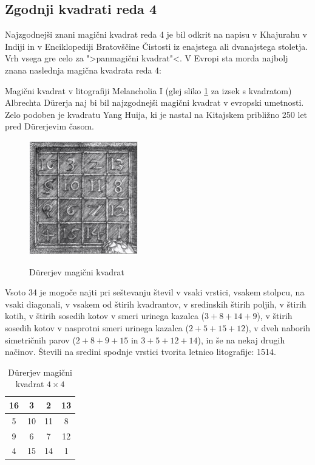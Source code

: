 \documentclass[a4paper,12pt]{article}
\theoremstyle{definition}
\theoremstyle{plain}
\newenvironment{magic}[3]{
   \begin{table}[!ht]
   \centering
   \caption{#2}
   \label{#3}
   \large
   \begin{tabular}{|*{#1}{c|}} \hline
}{
 \end{tabular}
   \normalsize
\end{table}  
}
\begin{document}

\subsection{Zgodnji kvadrati reda 4}

Najzgodnejši znani magični kvadrat reda 4 je bil odkrit na napisu
v Khajurahu v Indiji in v Enciklopediji Bratovščine Čistosti iz enajstega
ali dvanajstega stoletja. Vrh vsega gre celo za ">panmagični kvadrat"<.
V Evropi sta morda najbolj znana naslednja magična kvadrata reda 4:

Magični kvadrat v litografiji Melancholia I (glej sliko \ref{fig:durer}
za izsek s kvadratom) Albrechta Dürerja naj bi bil najzgodnejši magični kvadrat
v evropski umetnosti. Zelo podoben je kvadratu Yang Huija, ki je nastal na Kitajskem
približno 250 let pred Dürerjevim časom. %

\begin{figure}[!ht]
   \centering
   \caption{Dürerjev magični kvadrat}
\includegraphics[scale=1.5]{durer.png}
\label{fig:durer}
\end{figure}

Vsoto 34 je mogoče najti pri seštevanju števil v vsaki vrstici, vsakem stolpcu,
na vsaki diagonali, v vsakem od štirih kvadrantov, v sredinskih štirih poljih,
v štirih kotih, v štirih sosedih kotov v smeri urinega kazalca ($3+8+14+9$), v
štirih sosedih kotov v nasprotni smeri urinega kazalca ($2+5+15+12$), v dveh naborih
simetričnih parov ($2+8+9+15$ in $3+5+12+14$), in še na nekaj drugih načinov.
Števili na sredini spodnje vrstici tvorita letnico litografije: 1514.
%

\begin{magic}{4}{Dürerjev magični kvadrat $4\times 4$}{table:durer}
      16 &  3 &  2 & 13 \\\hline
       5 & 10 & 11 &  8 \\\hline
       9 &  6 &  7 & 12 \\\hline
       4 & 15 & 14 &  1 \\\hline
\end{magic}
\end{document}
